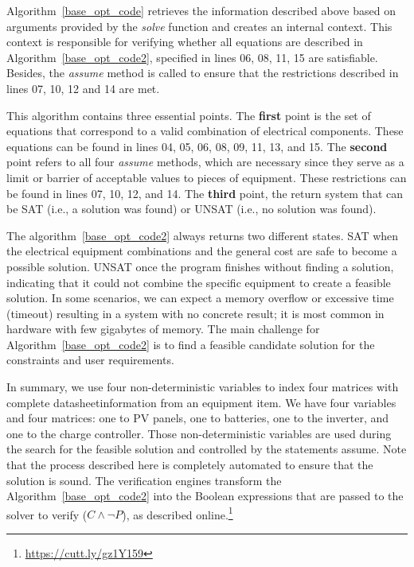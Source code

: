 \documentclass[journal]{IEEEtran}
\begin{document}
Algorithm~\ref{base_opt_code} retrieves the information described above based on arguments provided by the \textit{solve} function and creates an internal context. This context is responsible for verifying whether all equations are described in Algorithm~\ref{base_opt_code2}, specified in lines 06, 08, 11, 15 are satisfiable. Besides, the \textit{assume} method is called to ensure that the restrictions described in lines 07, 10, 12 and 14 are met.

This algorithm contains three essential points. The \textbf{first} point is the set of equations that correspond to a valid combination of electrical components. These equations can be found in lines 04, 05, 06, 08, 09, 11, 13, and 15. The \textbf{second} point refers to all four \textit{assume} methods, which are necessary since they serve as a limit or barrier of acceptable values to pieces of equipment. These restrictions can be found in lines 07, 10, 12, and 14. The \textbf{third} point, the return system that can be SAT (i.e., a solution was found) or UNSAT (i.e., no solution was found).

The algorithm~\ref{base_opt_code2} always returns two different states. SAT when the electrical equipment combinations and the general cost are safe to become a possible solution.  UNSAT once the program finishes without finding a solution, indicating that it could not combine the specific equipment to create a feasible solution. In some scenarios, we can expect a memory overflow or excessive time (timeout) resulting in a system with no concrete result; it is most common in hardware with few gigabytes of memory. The main challenge for Algorithm~\ref{base_opt_code2} is to find a feasible candidate solution for the constraints and user requirements.

In summary, we use four non-deterministic variables to index four matrices with complete datasheet\footnotemark[\value{footnote}] information from an equipment item. We have four variables and four matrices: one to PV panels, one to batteries, one to the inverter, and one to the charge controller. Those non-deterministic variables are used during the search for the feasible solution and controlled by the statements assume. Note that the process described here is completely automated to ensure that the solution is sound. The verification engines transform the Algorithm~\ref{base_opt_code2} into the Boolean expressions that are passed to the solver to verify ($C \wedge \neg P$), as described online.\footnote{\href{https://cutt.ly/gz1Y159}{https://cutt.ly/gz1Y159}}
\end{document}
